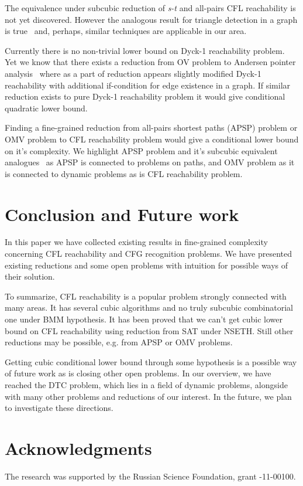 \documentclass[acmsmall,nonacm]{acmart}
\begin{document}
	The equivalence under subcubic reduction of \emph{s-t} and 
	all-pairs CFL reachability is not yet discovered. However the analogous result for triangle detection in a graph is true~\cite{10.1145/3186893} and, perhaps, similar techniques are applicable in our area. 
	
	Currently there is no non-trivial lower bound on Dyck-1 reachability problem. 
	Yet we know that there exists a reduction from OV problem to Andersen pointer analysis~\cite{10.1145/3434315} where as a part of reduction appears slightly modified Dyck-1 reachability with additional if-condition for edge existence in a graph. If similar reduction exists to pure Dyck-1 reachability problem it would give conditional quadratic lower bound. 
	
	Finding a fine-grained reduction from all-pairs shortest paths (APSP) problem or OMV problem to CFL reachability problem would give a conditional lower bound on it's complexity. We highlight APSP problem and it's subcubic equivalent analogues~\cite{10.1145/3186893} as APSP is connected to problems on paths, and OMV problem as it is connected to dynamic problems as is CFL reachability problem. 
	
	\section{Conclusion and Future work}
	
	In this paper we have collected existing results in fine-grained complexity concerning CFL reachability and CFG recognition problems. We have presented existing reductions and some open problems with intuition for possible ways of their solution. 
	
	To summarize, CFL reachability is a popular problem strongly connected with many areas. It has several cubic algorithms and no truly subcubic combinatorial one under BMM hypothesis. It has been proved that we can't get cubic lower bound on CFL reachability using reduction from SAT under NSETH. Still other reductions may be possible, e.g. from APSP or OMV problems. 
	
	Getting cubic conditional lower bound through some hypothesis is a possible way of future work as is closing other open problems. In our overview, we have reached the DTC problem, which lies in a field of dynamic problems, alongside with many other problems and reductions of our interest. In the future, we plan to investigate these directions. 
	
	\section{Acknowledgments}
	
	The research was supported by the Russian Science Foundation, grant -11-00100.
	
	
	
	
	
\end{document}
